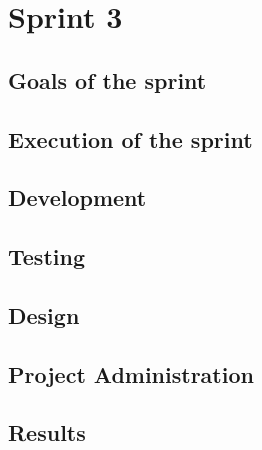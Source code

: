 \section{Sprint 3}
\subsection{Goals of the sprint}
\subsection{Execution of the sprint}
\subsection{Development}
\subsection{Testing}
\subsection{Design}
\subsection{Project Administration}
\subsection{Results}